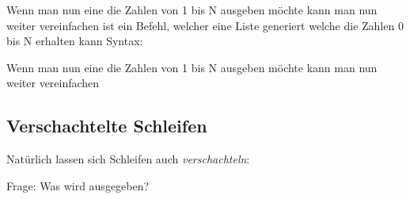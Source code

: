 \livecoding

\begin{frame}
    \slidehead
    Wenn man nun eine die Zahlen von 1 bis N ausgeben möchte kann man nun weiter vereinfachen
     ist ein Befehl, welcher eine Liste generiert welche die Zahlen 0 bis N erhalten kann
    Syntax: 
\end{frame}

\begin{frame}
    \slidehead
    Wenn man nun eine die Zahlen von 1 bis N ausgeben möchte kann man nun weiter vereinfachen
\end{frame}

\subsection{Verschachtelte Schleifen}
\begin{frame}
    \slidehead

    \vspace{-1.2ex}
    Natürlich lassen sich Schleifen auch \textit{verschachteln}:
    \vspace{-1.2ex}

    \pause
    \vspace{-1.5ex}
    \begin{block}{Frage: Was wird ausgegeben?}\pause
        \\
        \\
        \\
    \end{block}
\end{frame}

\livecoding


